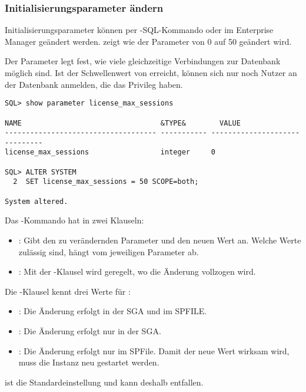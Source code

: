         \subsubsection{Initialisierungsparameter \"andern}
          Initialisierungsparameter k\"onnen per -SQL-Kommando oder im Enterprise Manager ge\"andert werden.  zeigt wie der Parameter  von 0 auf 50 ge\"andert wird.
          \begin{merke}
            Der Parameter  legt fest, wie viele gleichzeitige Verbindungen zur Datenbank m\"oglich sind. Ist der Schwellenwert von  erreicht, k\"onnen sich nur noch Nutzer an der Datenbank anmelden, die das Privileg  haben.
          \end{merke}
          \begin{lstlisting}[caption={\parameter{license\_max\_sessions} wird ge\"andert},label=admin15,language=oracle_sql,alsolanguage=sqlplus]
SQL> show parameter license_max_sessions

NAME                                 &TYPE&        VALUE
------------------------------------ ----------- ------------------------------
license_max_sessions                 integer     0

SQL> ALTER SYSTEM
  2  SET license_max_sessions = 50 SCOPE=both;

System altered.
          \end{lstlisting}
          Das -Kommando hat in  zwei Klauseln:
          \begin{itemize}
            \item {}: Gibt den zu ver\"andernden Parameter und den neuen Wert an. Welche Werte zul\"assig sind, h\"angt vom jeweiligen Parameter ab.
            \item {}: Mit der -Klausel wird geregelt, wo die \"Anderung vollzogen wird.
          \end{itemize}
          Die -Klausel kennt drei Werte f\"ur :
          \begin{itemize}
            \item {}: Die \"Anderung erfolgt in der SGA und im SPFILE.
            \item {}: Die \"Anderung erfolgt nur in der SGA.
            \item {}: Die \"Anderung  erfolgt nur im SPFile. Damit der neue Wert wirksam wird, muss die Instanz neu gestartet werden.
          \end{itemize}
          \begin{merke}
             ist die Standardeinstellung und kann deshalb entfallen.
          \end{merke}

